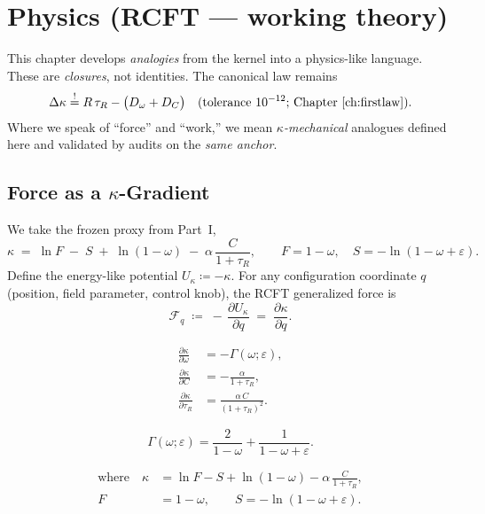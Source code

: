 \chapter{Physics \texorpdfstring{(RCFT — working theory)}{}}
\label{ch:physics}

\begin{callout}
This chapter develops \emph{analogies} from the kernel into a physics-like language. These are \emph{closures}, not identities. The canonical law remains
\[
\Delta\kappa \stackrel{!}{=} R\,\tau_{R} - \bigl(D_{\omega}+D_{C}\bigr)
\quad\text{(tolerance $10^{-12}$; Chapter~\ref{ch:firstlaw})}.
\]
Where we speak of “force” and “work,” we mean \emph{$\kappa$-mechanical} analogues defined here and validated by audits on the \emph{same anchor}.
\end{callout}

\section{Force as a \texorpdfstring{$\kappa$}{kappa}-Gradient}
We take the frozen proxy from Part~I,
\[
\kappa \;=\; \ln F \;-\; S \;+\; \ln(1-\omega) \;-\; \alpha\,\frac{C}{1+\tau_{R}},
\qquad F=1-\omega,\quad S=-\ln(1-\omega+\varepsilon).
\]
Define the energy-like potential \(U_\kappa\coloneqq -\kappa\).
For any configuration coordinate \(q\) (position, field parameter, control knob), the RCFT generalized force is
\[
\mathcal{F}_q \;\coloneqq\; -\,\frac{\partial U_\kappa}{\partial q} \;=\; \frac{\partial \kappa}{\partial q}.
\]
\newpage
\begin{eqbox}
\begingroup
\small
\setlength{\abovedisplayskip}{6pt}
\setlength{\belowdisplayskip}{6pt}
\setlength{\jot}{4pt}

\[
\begin{aligned}
\frac{\partial \kappa}{\partial \omega}   &= -\Gamma(\omega;\varepsilon),\\
\frac{\partial \kappa}{\partial C}        &= -\frac{\alpha}{1+\tau_{R}},\\
\frac{\partial \kappa}{\partial \tau_{R}} &= \frac{\alpha\,C}{(1+\tau_{R})^{2}}.
\end{aligned}
\]

\[
\Gamma(\omega;\varepsilon)
= \frac{2}{1-\omega} + \frac{1}{1-\omega+\varepsilon}.
\]

\[
\begin{aligned}
\text{where}\quad
\kappa &= \ln F - S + \ln(1-\omega) - \alpha\,\frac{C}{1+\tau_R},\\
F &= 1-\omega,\qquad
S = -\ln(1-\omega+\varepsilon).
\end{aligned}
\]
\endgroup
\end{eqbox}

